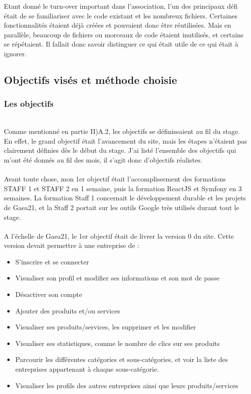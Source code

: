 Etant donné le turn-over important dans l'association, l'un des principaux défi était de se familiariser avec le code existant et les nombreux fichiers. 
Certaines fonctionnalités étaient déjà créées et pouvaient donc être réutilisées. Mais en parallèle, beaucoup de fichiers ou morceaux de code étaient inutilisés, et certains se répétaient. 
Il fallait donc savoir distinguer ce qui était utile de ce qui était à ignorer.

\pagebreak
\subsection{Objectifs visés et méthode choisie}

\subsubsection{Les objectifs}
~\\
Comme mentionné en partie II)A.2, les objectifs se définissaient au fil du stage. En effet, le grand objectif était l'avancement du site, mais les étapes n'étaient pas clairement définies dès le début du stage. 
J'ai listé l'ensemble des objectifs qui m'ont été donnés au fil des mois, il s'agit donc d'objectifs réalistes.\\\\

Avant toute chose, mon 1er objectif était l'accomplissement des formations STAFF 1 et STAFF 2 en 1 semaine, puis la formation ReactJS et Symfony en 3 semaines.
La formation Staff 1 concernait le développement durable et les projets de Gaea21, et la Staff 2 portait sur les outils Google très utilisés durant tout le stage.
\\\\A l'échelle de Gaea21, le 1er objectif était de livrer la version 0 du site. 
Cette version devait permettre à une entreprise de : 

\begin{itemize}
    \item S'inscrire et se connecter
    \item Visualiser son profil et modifier ses informations et son mot de passe
    \item Désactiver son compte
    \item Ajouter des produits et/ou services
    \item Visualiser ses produits/services, les supprimer et les modifier
    \item Visualiser ses statistiques, comme le nombre de clics sur ses produits
    \item Parcourir les différentes catégories et sous-catégories, et voir la liste des entreprises appartenant à chaque sous-catégorie.
    \item Visualiser les profils des autres entreprises ainsi que leurs produits/services
\end{itemize}

